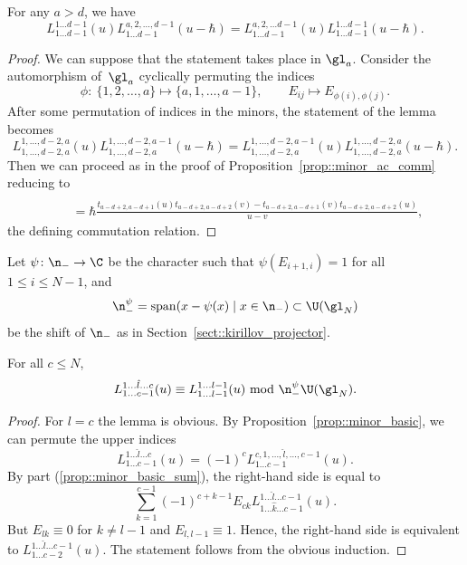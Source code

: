 	\begin{Proposition}
		\label{prop::minor_ac2_comm}
		For any $a>d$, we have
		\[
		L_{1\dots d-1}^{1\dots d-1}(u) L_{1\dots d-1}^{a,2,\dots,d-1}(u-\hbar) = L_{1 \dots d-1}^{a,2,\dots d-1}(u) L_{1\dots d-1}^{1\dots d-1}(u-\hbar).
		\]
		\begin{proof}
			We can suppose that the statement takes place in $\gl_a$. Consider the automorphism of~$\gl_a$ cyclically permuting the indices
			\[
			\phi\colon\ \{1,2,\dots,a \} \mapsto \{a,1,\dots,a-1\}, \qquad E_{ij} \mapsto E_{\phi(i),\phi(j)}.
			\]
			After some permutation of indices in the minors, the statement of the lemma becomes
			\[
			L_{1,\dots,d-2,a}^{1,\dots,d-2,a}(u) L_{1,\dots,d-2,a}^{1,\dots,d-2,a-1}(u-\hbar) = L_{1,\dots,d-2,a}^{1,\dots,d-2,a-1}(u) L_{1,\dots,d-2,a}^{1,\dots,d-2,a}(u-\hbar).
			\]
			Then we can proceed as in the proof of Proposition~\ref{prop::minor_ac_comm} reducing to
			\begin{gather*}
				[t_{a-d+2,a-d+2}(u),t_{a-d+1,a-d+2}(v)] \\
				\qquad=\hbar \frac{t_{a-d+2,a-d+1}(u) t_{a-d+2,a-d+2}(v) - t_{a-d+2,a-d+1}(v) t_{a-d+2,a-d+2}(u)}{u-v},
			\end{gather*}
			the defining commutation relation.
		\end{proof}
	\end{Proposition}
	
	Let $\psi\colon \n_- \rightarrow \C$ be the character such that $\psi(E_{i+1,i})=1$ for all $1\leq i \leq N-1$, and
	\[
	\n_-^{\psi} = \mathrm{span}(x - \psi(x)\mid x\in \n_-) \subset \U(\gl_N)
	\]
	be the shift of $\n_-$ as in Section~\ref{sect::kirillov_projector}.
	
	\begin{Proposition}
		\label{prop::minor_quotient}
		For all $c\leq N$,
		\[
		L_{1\dots c-1}^{1\dots \hat{l} \dots c}(u) \equiv L_{1\dots l-1}^{1\dots l-1}(u)\ \mathrm{mod}\ \n_-^{\psi} \U(\gl_N).
		\]
		\begin{proof}
			For $l=c$ the lemma is obvious. By Proposition~\ref{prop::minor_basic}, we can permute the upper indices
			\[
			L_{1\dots c-1}^{1\dots \hat{l} \dots c}(u) = (-1)^{c} L_{1\dots c-1}^{c,1,\dots,\hat{l},\dots, c-1}(u).
			\]
			By part (\ref{prop::minor_basic_sum}), the right-hand side is equal to
			\[
			\sum\limits_{k=1}^{c-1} (-1)^{c+k-1} E_{ck} L_{1\dots \hat{k} \dots c-1}^{1\dots \hat{l} \dots c-1}(u).
			\]
			But $E_{lk} \equiv 0$ for $k\neq l-1$ and $E_{l,l-1} \equiv 1$. Hence, the right-hand side is equivalent to $L_{1\dots c-2}^{1\dots \hat{l} \dots c-1}(u)$. The statement follows from the obvious induction.
		\end{proof}
	\end{Proposition}
	
